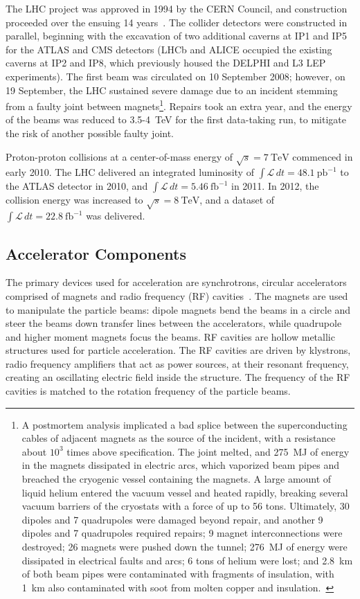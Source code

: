 The LHC project was approved in 1994 by the CERN Council, and construction proceeded over the ensuing 14 years~\cite{Evans:2010va}. The collider detectors were constructed in parallel, beginning with the excavation of two additional caverns at IP1 and IP5 for the ATLAS and CMS detectors (LHCb and ALICE occupied the existing caverns at IP2 and IP8, which previously housed the DELPHI and L3 LEP experiments). The first beam was circulated on 10 September 2008; however, on 19 September, the LHC sustained severe damage due to an incident stemming from a faulty joint between magnets\footnote{A postmortem analysis implicated a bad splice between the superconducting cables of adjacent magnets as the source of the incident, with a resistance about $10^3$ times above specification. The joint melted, and \SI{275}{\mega\joule} of energy in the magnets dissipated in electric arcs, which vaporized beam pipes and breached the cryogenic vessel containing the magnets. A large amount of liquid helium entered the vacuum vessel and heated rapidly, breaking several vacuum barriers of the cryostats with a force of up to 56 tons. Ultimately, 30 dipoles and 7 quadrupoles were damaged beyond repair, and another 9 dipoles and 7 quadrupoles required repairs; 9 magnet interconnections were destroyed; 26 magnets were pushed down the tunnel; \SI{276}{\mega\joule} of energy were dissipated in electrical faults and arcs; 6 tons of helium were lost; and \SI{2.8}{\kilo\meter} of both beam pipes were contaminated with fragments of insulation, with \SI{1}{\kilo\meter} also contaminated with soot from molten copper and insulation.~\cite{Rossi:2010el}}. Repairs took an extra year, and the energy of the beams was reduced to 3.5-\SI{4}{\tera\electronvolt} for the first data-taking run, to mitigate the risk of another possible faulty joint. 

Proton-proton collisions at a center-of-mass energy of $\sqrt{s}=\SI{7}{\tera\electronvolt}$ commenced in early 2010. The LHC delivered an integrated luminosity of $\int \mathcal{L}\, dt=\SI{48.1}{\pico\barn\tothe{-1}}$ to the ATLAS detector in 2010, and $\int \mathcal{L}\, dt=\SI{5.46}{\femto\barn\tothe{-1}}$ in 2011. In 2012, the collision energy was increased to $\sqrt{s}=\SI{8}{\tera\electronvolt}$, and a dataset of $\int \mathcal{L}\, dt=\SI{22.8}{\femto\barn\tothe{-1}}$ was delivered. 

\subsection{Accelerator Components}
The primary devices used for acceleration are synchrotrons, circular accelerators comprised of magnets and radio frequency (RF) cavities~\cite{wiedemann2007particle}. The magnets are used to manipulate the particle beams: dipole magnets bend the beams in a circle and steer the beams down transfer lines between the accelerators, while quadrupole and higher moment magnets focus the beams. RF cavities are hollow metallic structures used for particle acceleration. The RF cavities are driven by klystrons, radio frequency amplifiers that act as power sources, at their resonant frequency, creating an oscillating electric field inside the structure. The frequency of the RF cavities is matched to the rotation frequency of the particle beams.


